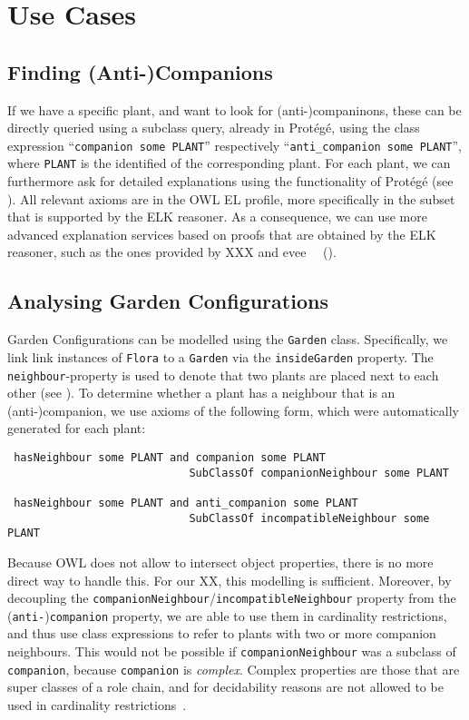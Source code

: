 \section{Use Cases}

\subsection{Finding (Anti-)Companions}

If we have a specific plant, and want to look for (anti-)companinons, these can be
directly queried using a subclass query, already in Prot\'eg\'e, using the class expression
``\verb|companion some PLANT|'' respectively
``\verb|anti_companion some PLANT|'', where \verb|PLANT| is
the identified of the corresponding plant. For each plant, we can furthermore ask for detailed
explanations using the functionality of Prot\'eg\'e (see ).
All relevant axioms are in the OWL EL profile, more
specifically in the subset that is supported by the ELK reasoner\cite{ELK}. As a consequence,
we can use more advanced explanation services based on proofs that are obtained by the ELK
reasoner, such as the ones provided by XXX and evee~\cite{evee}~\cite{EVEE} ().

\newcommand{\cl}[1]{\texttt{#1}}

\subsection{Analysing Garden Configurations}

Garden Configurations can be modelled using the \cl{Garden} class. Specifically, we link
link instances of \cl{Flora} to a \cl{Garden} via the \cl{insideGarden} property. The
\cl{neighbour}-property is used to denote that two plants are placed next to each other
(see ). To determine whether a plant has a neighbour that is an
(anti-)companion, we use axioms of the following form, which were automatically generated
for each plant:
\begin{verbatim}
 hasNeighbour some PLANT and companion some PLANT
                            SubClassOf companionNeighbour some PLANT

 hasNeighbour some PLANT and anti_companion some PLANT
                            SubClassOf incompatibleNeighbour some PLANT
\end{verbatim}
Because OWL does not allow to intersect object properties, there is no more direct way
to handle this. For our XX, this modelling is sufficient. Moreover, by decoupling the
\cl{companionNeighbour}/\cl{incompatibleNeighbour} property from the (\cl{anti-})\cl{companion}
property, we are able to use them in cardinality restrictions, and thus use class expressions
to refer to plants with two or more companion neighbours. This would not be possible if
\cl{companionNeighbour} was a subclass of \cl{companion}, because \cl{companion} is
\emph{complex}. Complex properties are those that are super classes of a role chain, and
for decidability reasons are not allowed to be used in cardinality restrictions~\cite{TODO}.


